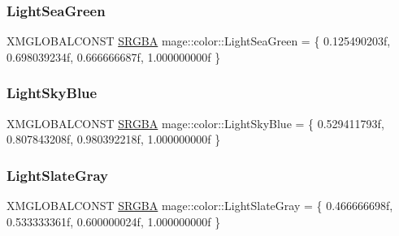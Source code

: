 \hypertarget{namespacemage_1_1color_a29e3751890e54b12a1d323847cdce8d4}{}\label{namespacemage_1_1color_a29e3751890e54b12a1d323847cdce8d4} 
\subsubsection{\texorpdfstring{Light\+Sea\+Green}{LightSeaGreen}}
{\footnotesize\ttfamily X\+M\+G\+L\+O\+B\+A\+L\+C\+O\+N\+ST \hyperlink{structmage_1_1_s_r_g_b_a}{S\+R\+G\+BA} mage\+::color\+::\+Light\+Sea\+Green = \{ 0.\+125490203f, 0.\+698039234f, 0.\+666666687f, 1.\+000000000f \}}

\hypertarget{namespacemage_1_1color_a1de72837fb064b35cb6860e6f155a48a}{}\label{namespacemage_1_1color_a1de72837fb064b35cb6860e6f155a48a} 
\subsubsection{\texorpdfstring{Light\+Sky\+Blue}{LightSkyBlue}}
{\footnotesize\ttfamily X\+M\+G\+L\+O\+B\+A\+L\+C\+O\+N\+ST \hyperlink{structmage_1_1_s_r_g_b_a}{S\+R\+G\+BA} mage\+::color\+::\+Light\+Sky\+Blue = \{ 0.\+529411793f, 0.\+807843208f, 0.\+980392218f, 1.\+000000000f \}}

\hypertarget{namespacemage_1_1color_a3a252bf26004ec58ff18674953dc19c6}{}\label{namespacemage_1_1color_a3a252bf26004ec58ff18674953dc19c6} 
\subsubsection{\texorpdfstring{Light\+Slate\+Gray}{LightSlateGray}}
{\footnotesize\ttfamily X\+M\+G\+L\+O\+B\+A\+L\+C\+O\+N\+ST \hyperlink{structmage_1_1_s_r_g_b_a}{S\+R\+G\+BA} mage\+::color\+::\+Light\+Slate\+Gray = \{ 0.\+466666698f, 0.\+533333361f, 0.\+600000024f, 1.\+000000000f \}}

\hypertarget{namespacemage_1_1color_a8b7fb9e3843d37cd4acca3579f2254ee}{}\label{namespacemage_1_1color_a8b7fb9e3843d37cd4acca3579f2254ee} 
